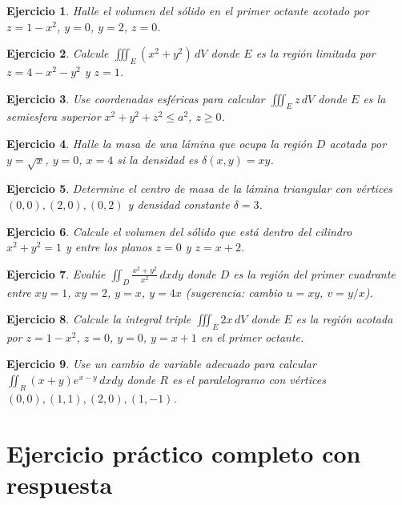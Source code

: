 \documentclass[12pt,spanish]{article}
\newtheorem{ejercicio}{Ejercicio}[section]
\begin{document}
\begin{ejercicio}
Halle el volumen del sólido en el primer octante acotado por $z=1-x^2$, $y=0$, $y=2$, $z=0$.
\end{ejercicio}

\begin{ejercicio}
Calcule $\displaystyle\iiint_E (x^2+y^2)\,dV$ donde $E$ es la región limitada por $z=4-x^2-y^2$ y $z=1$.
\end{ejercicio}

\begin{ejercicio}
Use coordenadas esféricas para calcular $\displaystyle\iiint_E z\,dV$ donde $E$ es la semiesfera superior $x^2+y^2+z^2\le a^2$, $z\ge0$.
\end{ejercicio}

\begin{ejercicio}
Halle la masa de una lámina que ocupa la región $D$ acotada por $y=\sqrt{x}$, $y=0$, $x=4$ si la densidad es $\delta(x,y)=xy$.
\end{ejercicio}

\begin{ejercicio}
Determine el centro de masa de la lámina triangular con vértices $(0,0),(2,0),(0,2)$ y densidad constante $\delta=3$.
\end{ejercicio}

\begin{ejercicio}
Calcule el volumen del sólido que está dentro del cilindro $x^2+y^2=1$ y entre los planos $z=0$ y $z=x+2$.
\end{ejercicio}

\begin{ejercicio}
Evalúe $\displaystyle\iint_D \frac{x^2+y^2}{x^2}\,dxdy$ donde $D$ es la región del primer cuadrante entre $xy=1$, $xy=2$, $y=x$, $y=4x$ (sugerencia: cambio $u=xy$, $v=y/x$).
\end{ejercicio}

\begin{ejercicio}
Calcule la integral triple $\displaystyle\iiint_E 2x\,dV$ donde $E$ es la región acotada por $z=1-x^2$, $z=0$, $y=0$, $y=x+1$ en el primer octante.
\end{ejercicio}

\begin{ejercicio}
Use un cambio de variable adecuado para calcular $\displaystyle\iint_R (x+y)e^{x-y}\,dxdy$ donde $R$ es el paralelogramo con vértices $(0,0),(1,1),(2,0),(1,-1)$.
\end{ejercicio}

\section{Ejercicio práctico completo con respuesta}
\end{document}

